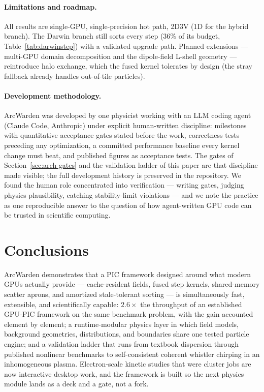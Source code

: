\documentclass[11pt]{article}
\newcommand{\arcw}{ArcWarden}
\begin{document}
\paragraph{Limitations and roadmap.}
All results are single-GPU, single-precision hot path, 2D3V (1D for the
hybrid branch). The Darwin branch still sorts every step (36\% of its
budget, Table~\ref{tab:darwinstep}) with a validated upgrade path.
Planned extensions --- multi-GPU domain decomposition and the
dipole-field L-shell geometry --- reintroduce halo exchange, which the
fused kernel tolerates by design (the stray fallback already handles
out-of-tile particles).

\paragraph{Development methodology.}
\arcw{} was developed by one physicist working with an LLM coding agent
(Claude Code, Anthropic) under explicit human-written discipline:
milestones with quantitative acceptance gates stated before the work,
correctness tests preceding any optimization, a committed performance
baseline every kernel change must beat, and published figures as
acceptance tests. The gates of Section~\ref{sec:arch-gates} and the
validation ladder of this paper are that discipline made visible; the
full development history is preserved in the repository. We found the
human role concentrated into verification --- writing gates, judging
physics plausibility, catching stability-limit violations --- and we
note the practice as one reproducible answer to the question of how
agent-written GPU code can be trusted in scientific computing.

\section{Conclusions}
\label{sec:conclusions}
\arcw{} demonstrates that a PIC framework designed around what modern
GPUs actually provide --- cache-resident fields, fused step kernels,
shared-memory scatter aprons, and amortized stale-tolerant sorting ---
is simultaneously fast, extensible, and scientifically capable:
$2.6\times$ the throughput of an established GPU-PIC framework on the
same benchmark problem, with the gain accounted element by element; a
runtime-modular physics layer in which field models, background
geometries, distributions, and boundaries share one tested particle
engine; and a validation ladder that runs from textbook dispersion
through published nonlinear benchmarks to self-consistent coherent
whistler chirping in an inhomogeneous plasma. Electron-scale kinetic
studies that were cluster jobs are now interactive desktop work, and
the framework is built so the next physics module lands as a deck and
a gate, not a fork.
\end{document}
